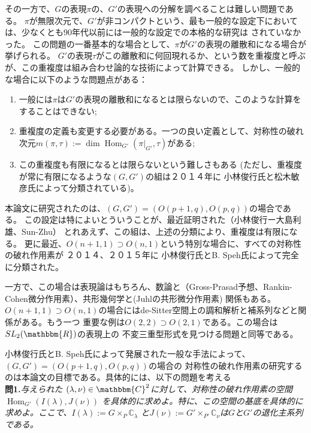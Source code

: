 \documentclass[a4paper]{article} %
\newcommand{\assign}{:=}
\newcommand{\tmop}[1]{\ensuremath{\operatorname{#1}}}
\newcommand{\tmtextbf}[1]{{\bfseries{#1}}}
\newcommand{\tmtextit}[1]{{\itshape{#1}}}
\begin{document}
その一方で、$G$の表現$\pi$の、$G'$の表現への分解を調べることは難しい問題である。
$\pi$が無限次元で、$G'$が非コンパクトという、最も一般的な設定下においては、少なくとも90年代以前には一般的な設定での本格的な研究は
されていなかった。
この問題の一番基本的な場合として、$\pi$が$G'$の表現の離散和になる場合が挙げられる。
$G'$の表現$\tau$がこの離散和に何回現れるか、という数を重複度と呼ぶが、この重複度は組み合わせ論的な技術によって計算できる。
しかし、一般的な場合に以下のような問題点がある：
\begin{enumerate}
\item 一般には$\pi$は$G'$の表現の離散和になるとは限らないので、このような計算をすることはできない;
\item 重複度の定義も変更する必要がある。一つの良い定義として、対称性の破れ次元$m(\pi,\tau)\assign\dim\tmop{Hom}_{G'}(\pi |_{G'},
 \tau)$がある;
\item この重複度も有限になるとは限らないという難しさもある (ただし、重複度が常に有限になるような$(G,G')$の組は２０１４年に
小林俊行氏と松木敏彦氏によって分類されている)。
\end{enumerate}

本論文に研究されたのは、$( G, G') = ( O ( p + 1, q), O ( p,q))$の場合である。
この設定は特によいとういうことが、最近証明された（小林俊行ー大島利雄、Sun-Zhu）
とれあえず、この組は、上述の分類により、重複度は有限になる。
更に最近、$O ( n + 1, 1) \supset O ( n, 1)$という特別な場合に、すべての対称性の破れ作用素が
２０１４、２０１５年に
小林俊行氏とB. Speh氏によって完全に分類された。

一方で、この場合は表現論はもちろん、数論と（Gross-Prasad予想、Rankin-Cohen微分作用素）、共形幾何学と(Juhlの共形微分作用素)
関係もある。$O ( n + 1, 1) \supset O ( n, 1)$の場合にはde-Sitter空間上の調和解析と補系列などと関係がある。もう一つ
重要な例は$O ( 2, 2) \supset O ( 2, 1)$である。この場合は$SL_2(\mathbbm{R})$の表現上の
不変三重型形式を見つける問題と同等である。

小林俊行氏とB. Speh氏によって発展された一般な手法によって、$( G, G') = ( O ( p + 1, q), O ( p,q))$の場合の
対称性の破れ作用素の研究するのは本論文の目標である。具体的には、以下の問題を考える\\

{\noindent}\tmtextbf{問\textbf{1}.}\tmtextit{与えられた $( \lambda, \nu) \in
\mathbbm{C}^2$に対して、対称性の破れ作用素の空間 $\tmop{Hom}_{G'} ( I (
\lambda), J ( \nu))$ を具体的に求めよ。特に、この空間の基底を具体的に求めよ。ここで、$I(\lambda):=G\times_P\mathbb{C}_\lambda$
と$J(\nu):=G'\times_{P'}\mathbb{C}_\nu$は$G$と$G'$の退化主系列である。}\\
\end{document}
